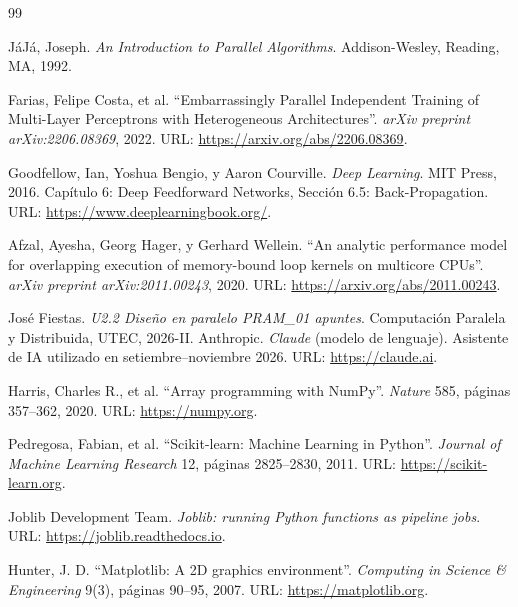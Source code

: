 \documentclass[11pt, a4paper]{article}
\begin{document}
\begin{thebibliography}{99}

JáJá, Joseph.
\textit{An Introduction to Parallel Algorithms}.
Addison-Wesley, Reading, MA, 1992.

Farias, Felipe Costa, et al.
``Embarrassingly Parallel Independent Training of Multi-Layer Perceptrons with Heterogeneous Architectures''.
\textit{arXiv preprint arXiv:2206.08369}, 2022.
URL: \url{https://arxiv.org/abs/2206.08369}.

Goodfellow, Ian, Yoshua Bengio, y Aaron Courville.
\textit{Deep Learning}.
MIT Press, 2016. Capítulo 6: Deep Feedforward Networks, Sección 6.5: Back-Propagation.
URL: \url{https://www.deeplearningbook.org/}.

Afzal, Ayesha, Georg Hager, y Gerhard Wellein.
``An analytic performance model for overlapping execution of memory-bound loop kernels on multicore CPUs''.
\textit{arXiv preprint arXiv:2011.00243}, 2020.
URL: \url{https://arxiv.org/abs/2011.00243}.

José Fiestas.
\textit{U2.2 Diseño en paralelo PRAM\_01 apuntes}.
Computación Paralela y Distribuida, UTEC, 2026-II.
Anthropic.
\textit{Claude} (modelo de lenguaje). Asistente de IA utilizado en setiembre--noviembre 2026.
URL: \url{https://claude.ai}.

Harris, Charles R., et al.
``Array programming with NumPy''.
\textit{Nature} 585, p\'aginas 357--362, 2020.
URL: \url{https://numpy.org}.

Pedregosa, Fabian, et al.
``Scikit-learn: Machine Learning in Python''.
\textit{Journal of Machine Learning Research} 12, p\'aginas 2825--2830, 2011.
URL: \url{https://scikit-learn.org}.

Joblib Development Team.
\textit{Joblib: running Python functions as pipeline jobs}.
URL: \url{https://joblib.readthedocs.io}.

Hunter, J. D.
``Matplotlib: A 2D graphics environment''.
\textit{Computing in Science \& Engineering} 9(3), p\'aginas 90--95, 2007.
URL: \url{https://matplotlib.org}.

\end{thebibliography}
\end{document}
